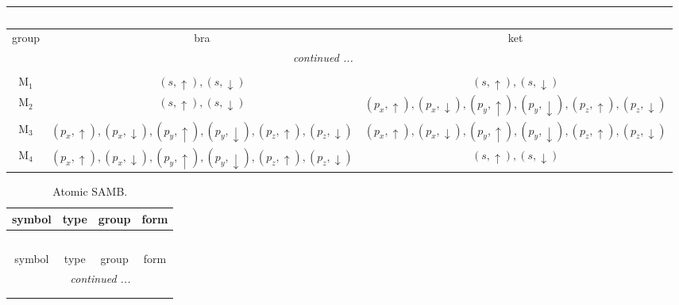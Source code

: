 \documentclass[fleqn,10pt,landscape]{article}
\begin{document}
\begin{itemize}
\begin{center}
\begin{longtable}{c|c|c}
\multicolumn{2}{l}{\tablename\ \thetable{}} \\
 \hline \hline
group & bra & ket \\ \hline \endhead

 \hline \hline
\multicolumn{2}{r}{\footnotesize\it continued ...} \\ \endfoot

 \hline \hline
\multicolumn{2}{r}{} \\ \endlastfoot

M$_{1}$ & $(s,\uparrow), (s,\downarrow)$ & $(s,\uparrow), (s,\downarrow)$ \\
M$_{2}$ & $(s,\uparrow), (s,\downarrow)$ & $(p_{x},\uparrow), (p_{x},\downarrow), (p_{y},\uparrow), (p_{y},\downarrow), (p_{z},\uparrow), (p_{z},\downarrow)$ \\
M$_{3}$ & $(p_{x},\uparrow), (p_{x},\downarrow), (p_{y},\uparrow), (p_{y},\downarrow), (p_{z},\uparrow), (p_{z},\downarrow)$ & $(p_{x},\uparrow), (p_{x},\downarrow), (p_{y},\uparrow), (p_{y},\downarrow), (p_{z},\uparrow), (p_{z},\downarrow)$ \\
M$_{4}$ & $(p_{x},\uparrow), (p_{x},\downarrow), (p_{y},\uparrow), (p_{y},\downarrow), (p_{z},\uparrow), (p_{z},\downarrow)$ & $(s,\uparrow), (s,\downarrow)$ \\
\end{longtable}
\end{center}
\begin{center}
\renewcommand{\arraystretch}{1.3}
\begin{longtable}{c|c|c|c}
\caption{Atomic SAMB.}
 \\
 \hline \hline
symbol & type & group & form \\ \hline \endfirsthead

\multicolumn{3}{l}{\tablename\ \thetable{}} \\
 \hline \hline
symbol & type & group & form \\ \hline \endhead

 \hline \hline
\multicolumn{3}{r}{\footnotesize\it continued ...} \\ \endfoot

 \hline \hline
\multicolumn{3}{r}{} \\ \endlastfoot


\end{longtable}
\end{center}
\end{itemize}
\end{document}
